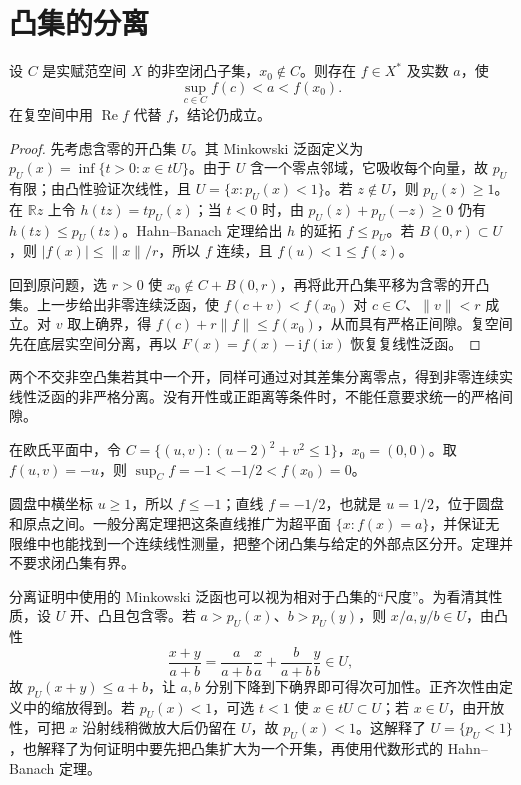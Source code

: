 \documentclass[UTF8,12pt,a4paper,fontset=fandol]{ctexbook}
\begin{document}
\section{凸集的分离}
\begin{theorem}[点与闭凸集的严格分离]\label{thm:fa-separation}
设 $C$ 是实赋范空间 $X$ 的非空闭凸子集，$x_0\notin C$。则存在 $f\in X^*$ 及实数 $a$，使
\[
 \sup_{c\in C}f(c)<a<f(x_0).
\]
在复空间中用 $\operatorname{Re}f$ 代替 $f$，结论仍成立。
\end{theorem}
\begin{proof}
先考虑含零的开凸集 $U$。其 Minkowski 泛函定义为 $p_U(x)=\inf\{t>0:x\in tU\}$。由于 $U$ 含一个零点邻域，它吸收每个向量，故 $p_U$ 有限；由凸性验证次线性，且 $U=\{x:p_U(x)<1\}$。若 $z\notin U$，则 $p_U(z)\geq1$。在 $\mathbb Rz$ 上令 $h(tz)=tp_U(z)$；当 $t<0$ 时，由 $p_U(z)+p_U(-z)\geq0$ 仍有 $h(tz)\leq p_U(tz)$。Hahn--Banach 定理给出 $h$ 的延拓 $f\leq p_U$。若 $B(0,r)\subset U$，则 $|f(x)|\leq\|x\|/r$，所以 $f$ 连续，且 $f(u)<1\leq f(z)$。

回到原问题，选 $r>0$ 使 $x_0\notin C+B(0,r)$，再将此开凸集平移为含零的开凸集。上一步给出非零连续泛函，使 $f(c+v)<f(x_0)$ 对 $c\in C$、$\|v\|<r$ 成立。对 $v$ 取上确界，得 $f(c)+r\|f\|\leq f(x_0)$，从而具有严格正间隙。复空间先在底层实空间分离，再以 $F(x)=f(x)-\mathrm if(\mathrm ix)$ 恢复复线性泛函。
\end{proof}
两个不交非空凸集若其中一个开，同样可通过对其差集分离零点，得到非零连续实线性泛函的非严格分离。没有开性或正距离等条件时，不能任意要求统一的严格间隙。

\begin{example}[分离定理的二维图景]
在欧氏平面中，令 $C=\{(u,v):(u-2)^2+v^2\leq1\}$，$x_0=(0,0)$。取 $f(u,v)=-u$，则 $\sup_C f=-1< -1/2<f(x_0)=0$。
\end{example}
\begin{solve}
圆盘中横坐标 $u\geq1$，所以 $f\leq-1$；直线 $f=-1/2$，也就是 $u=1/2$，位于圆盘和原点之间。一般分离定理把这条直线推广为超平面 $\{x:f(x)=a\}$，并保证无限维中也能找到一个连续线性测量，把整个闭凸集与给定的外部点区分开。定理并不要求闭凸集有界。
\end{solve}

分离证明中使用的 Minkowski 泛函也可以视为相对于凸集的“尺度”。为看清其性质，设 $U$ 开、凸且包含零。若 $a>p_U(x)$、$b>p_U(y)$，则 $x/a,y/b\in U$，由凸性
\[
 \frac{x+y}{a+b}=\frac a{a+b}\frac xa+\frac b{a+b}\frac yb\in U,
\]
故 $p_U(x+y)\leq a+b$，让 $a,b$ 分别下降到下确界即可得次可加性。正齐次性由定义中的缩放得到。若 $p_U(x)<1$，可选 $t<1$ 使 $x\in tU\subset U$；若 $x\in U$，由开放性，可把 $x$ 沿射线稍微放大后仍留在 $U$，故 $p_U(x)<1$。这解释了 $U=\{p_U<1\}$，也解释了为何证明中要先把凸集扩大为一个开集，再使用代数形式的 Hahn--Banach 定理。
\end{document}
